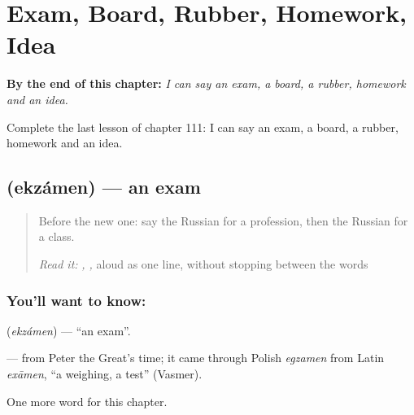 
\chapter{Exam, Board, Rubber, Homework, Idea}
\label{ch:ru-exam-board-rubber-homework-idea}

\begin{chapteropening}
\textbf{By the end of this chapter:} \emph{I can say an exam, a board, a rubber, homework and an idea.}

Complete the last lesson of chapter 111: I can say an exam, a board, a rubber, homework and an idea.
\end{chapteropening}

\section[\texorpdfstring{\ru{экзамен} (ekzámen)}{экзамен (ekzámen)}]{ (ekzámen) — an exam}

\label{lesson:RU-C111-exam}



\begin{quote}
Before the new one: say the Russian for a profession, then the Russian for a class.

\emph{Read it:} \emph{, , } aloud as one line, without stopping between the words
\end{quote}

\subsection*{You'll want to know: }
\textbf{} (\emph{ekzámen}) — \textquotedblleft{}an exam\textquotedblright{}.

\begin{cousinweb}
\textbf{} — from Peter the Great's time; it came through Polish \emph{egzamen} from Latin \emph{exāmen}, \textquotedblleft{}a weighing, a test\textquotedblright{} (Vasmer).
\end{cousinweb}

\begin{grammarlens}[title={What you've built}]
One more word for this chapter.
\end{grammarlens}

